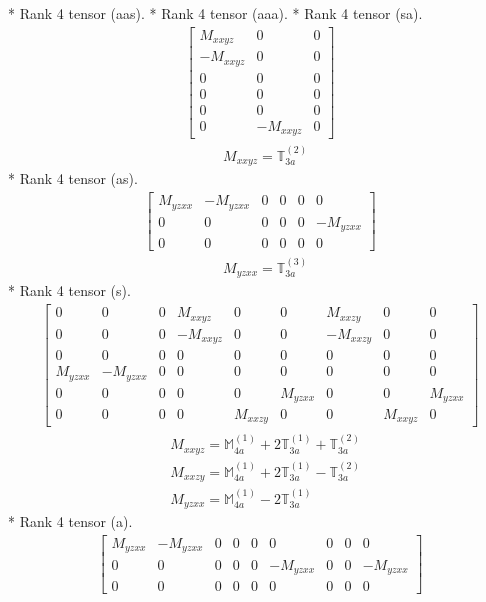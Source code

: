 \documentclass[fleqn,8pt,landscape]{jsarticle}
\begin{document}
* Rank 4 tensor (aas).
* Rank 4 tensor (aaa).
* Rank 4 tensor (sa).
\begin{align*}
\begin{bmatrix} M_{xxyz} & 0 & 0 \\ - M_{xxyz} & 0 & 0 \\ 0 & 0 & 0 \\ 0 & 0 & 0 \\ 0 & 0 & 0 \\ 0 & - M_{xxyz} & 0 \end{bmatrix}
\end{align*}
\begin{align*}
& M_{xxyz} = \mathbb{T}_{3a}^{(2)}
\end{align*}
* Rank 4 tensor (as).
\begin{align*}
\begin{bmatrix} M_{yzxx} & - M_{yzxx} & 0 & 0 & 0 & 0 \\ 0 & 0 & 0 & 0 & 0 & - M_{yzxx} \\ 0 & 0 & 0 & 0 & 0 & 0 \end{bmatrix}
\end{align*}
\begin{align*}
& M_{yzxx} = \mathbb{T}_{3a}^{(3)}
\end{align*}
* Rank 4 tensor (s).
\begin{align*}
\begin{bmatrix} 0 & 0 & 0 & M_{xxyz} & 0 & 0 & M_{xxzy} & 0 & 0 \\ 0 & 0 & 0 & - M_{xxyz} & 0 & 0 & - M_{xxzy} & 0 & 0 \\ 0 & 0 & 0 & 0 & 0 & 0 & 0 & 0 & 0 \\ M_{yzxx} & - M_{yzxx} & 0 & 0 & 0 & 0 & 0 & 0 & 0 \\ 0 & 0 & 0 & 0 & 0 & M_{yzxx} & 0 & 0 & M_{yzxx} \\ 0 & 0 & 0 & 0 & M_{xxzy} & 0 & 0 & M_{xxyz} & 0 \end{bmatrix}
\end{align*}
\begin{align*}
& M_{xxyz} = \mathbb{M}_{4a}^{(1)} + 2 \mathbb{T}_{3a}^{(1)} + \mathbb{T}_{3a}^{(2)} \\
& M_{xxzy} = \mathbb{M}_{4a}^{(1)} + 2 \mathbb{T}_{3a}^{(1)} - \mathbb{T}_{3a}^{(2)} \\
& M_{yzxx} = \mathbb{M}_{4a}^{(1)} - 2 \mathbb{T}_{3a}^{(1)}
\end{align*}
* Rank 4 tensor (a).
\begin{align*}
\begin{bmatrix} M_{yzxx} & - M_{yzxx} & 0 & 0 & 0 & 0 & 0 & 0 & 0 \\ 0 & 0 & 0 & 0 & 0 & - M_{yzxx} & 0 & 0 & - M_{yzxx} \\ 0 & 0 & 0 & 0 & 0 & 0 & 0 & 0 & 0 \end{bmatrix}
\end{align*}
\end{document}
